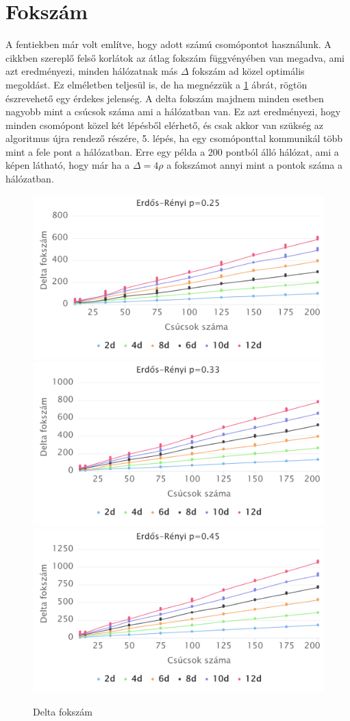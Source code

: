 \documentclass[12pt]{report}
\begin{document}
\section{Fokszám}

A fentiekben már volt említve, hogy adott számú csomópontot használunk.
A cikkben szereplő felső korlátok az átlag fokszám függvényében van megadva, ami azt eredményezi, minden hálózatnak más $\Delta$ fokszám ad közel optimális megoldást.
Ez elméletben teljesül is, de ha megnézzük a \ref{delta} ábrát, rögtön észrevehető egy érdekes jelenség. 
A delta fokszám majdnem minden esetben nagyobb mint a csúcsok száma ami a hálózatban van.
Ez azt eredményezi, hogy minden csomópont közel két lépésből elérhető, és csak akkor van szükség az algoritmus újra rendező részére, 5. lépés, ha egy csomóponttal kommunikál több mint a fele pont a hálózatban.
Erre egy példa a 200 pontból álló hálózat, ami a képen látható, hogy már ha a $\Delta=4\rho$ a fokszámot annyi mint a pontok száma a hálózatban.

\begin{figure}[h]
	\begin{center}
		\includegraphics[width=0.40\linewidth]{pictures/constant_dan_ratio25_delta.png}
		\includegraphics[width=0.40\linewidth]{pictures/constant_dan_ratio33_delta.png}		
		\includegraphics[width=0.40\linewidth]{pictures/constant_dan_ratio45_delta.png}
		\caption{Delta fokszám}
		\label{delta}
	\end{center}
\end{figure}
\end{document}
